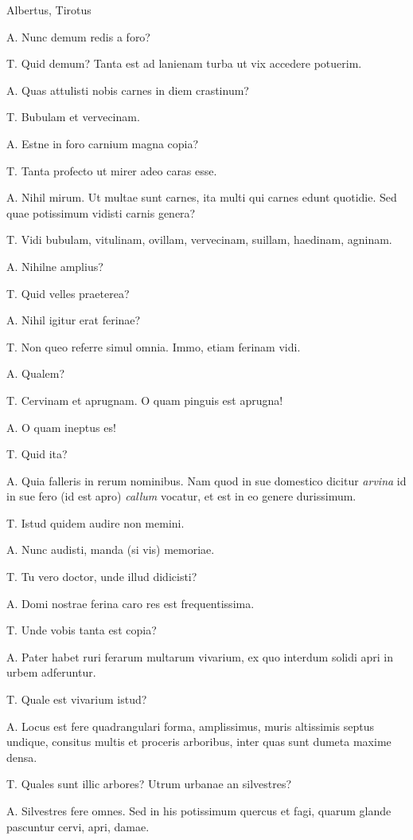 \documentclass{article}
\begin{document}
Albertus, Tirotus

A. Nunc demum redis a foro?

T. Quid demum? Tanta est ad lanienam turba ut vix accedere potuerim.

A. Quas attulisti nobis carnes in diem crastinum?

T. Bubulam et vervecinam.

A. Estne in foro carnium magna copia?

T. Tanta profecto ut mirer adeo caras esse.

A. Nihil mirum. Ut multae sunt carnes, ita multi qui carnes edunt quotidie. Sed quae potissimum vidisti carnis genera?

T. Vidi bubulam, vitulinam, ovillam, vervecinam, suillam, haedinam, agninam.

A. Nihilne amplius?

T. Quid velles praeterea?

A. Nihil igitur erat ferinae?

T. Non queo referre simul omnia. Immo, etiam ferinam vidi.

A. Qualem?

T. Cervinam et aprugnam. O quam pinguis est aprugna!

A. O quam ineptus es!

T. Quid ita?

A. Quia falleris in rerum nominibus. Nam quod in sue domestico dicitur \emph{arvina} id in sue fero (id est apro) \emph{callum} vocatur, et est in eo genere durissimum.

T. Istud quidem audire non memini.

A. Nunc audisti, manda (si vis) memoriae.

T. Tu vero doctor, unde illud didicisti?

A. Domi nostrae ferina caro res est frequentissima.

T. Unde vobis tanta est copia?

A. Pater habet ruri ferarum multarum vivarium, ex quo interdum solidi apri in urbem adferuntur.

T. Quale est vivarium istud?

A. Locus est fere quadrangulari forma, amplissimus, muris altissimis septus undique, consitus multis et proceris arboribus, inter quas sunt dumeta maxime densa.

T. Quales sunt illic arbores? Utrum urbanae an silvestres?

A. Silvestres fere omnes. Sed in his potissimum quercus et fagi, quarum glande pascuntur cervi, apri, damae.
\end{document}
